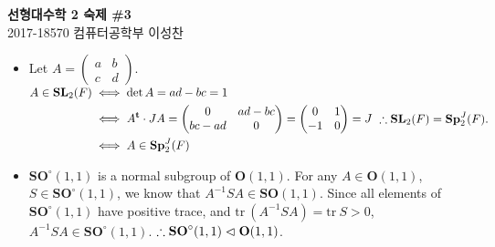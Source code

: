 \documentclass[12pt]{report}
\newcommand{\numl}[1]{\item[\large\textbf{\sffamily #1}]}
\newcommand{\rmbf}[1]{\mathrm{\mathbf{#1}}}
\newcommand{\trans}{^{\mathrm{\mathbf{t}}}}
\newcommand{\inv}{^{-1}}
\newcommand{\tr}{\text{tr}\:}
\renewcommand{\inv}{^{-1}}
\newcommand{\pnsub}{\mathrel{\lhd}}
\begin{document}
\begin{center}
\textbf{\Large 선형대수학 2 숙제 \#3}\\
\large 2017-18570 컴퓨터공학부 이성찬
\end{center}

\begin{itemize}
\numl{13.3.11} Let 
	$A = \begin{pmatrix}
		a & b \\ c & d
	\end{pmatrix}$.\\
	$\begin{aligned}
		A \in \rmbf{SL}_2(F) &\iff \det A = ad-bc = 1 \\ & \iff A\trans\cdot JA = \begin{pmatrix}
		0 & ad-bc \\ bc-ad & 0
		\end{pmatrix} = \begin{pmatrix}
		0 & 1 \\ -1 & 0
		\end{pmatrix} = J \\ & \iff A\in \rmbf{Sp}_2^J(F)
	\end{aligned}\\ ~\hfill \therefore \rmbf{SL}_2(F) = \rmbf{Sp}_2^J(F).$
	
\numl{13.4.4} $\rmbf{SO}^{\circ} (1, 1)$ is a normal subgroup of $\rmbf{O}(1, 1)$. For any $A\in \rmbf{O}(1, 1)$, $S\in \rmbf{SO}^\circ (1, 1)$, we know that $A\inv S A \in \rmbf{SO}(1, 1)$. Since all elements of $\rmbf{SO}^\circ (1, 1)$ have positive trace, and $\tr (A\inv S A) = \tr S > 0$, $A\inv S A \in \rmbf{SO}^\circ (1, 1)$. $\hfill \therefore \rmbf{SO}^\circ (1, 1) \pnsub \rmbf{O}(1, 1)$. 


\end{itemize}
\end{document}
